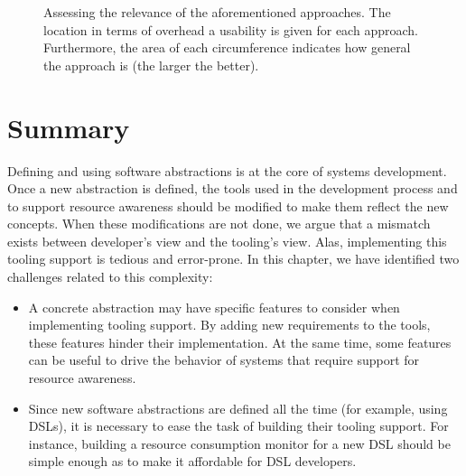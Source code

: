 \begin{figure}[!ht]
\caption{Assessing the relevance of the aforementioned approaches. The location in terms of overhead a usability is given for each approach. Furthermore, the area of each circumference indicates how general the approach is (the larger the better).} \label{fig:position-approaches-to-simplify}
\end{figure}

\section{Summary}


Defining and using software abstractions is at the core of systems development.
Once a new abstraction is defined, the tools used in the development process and to support resource awareness should be modified to make them reflect the new concepts.
When these modifications are not done, we argue that a mismatch exists between developer's view and the tooling's view.
Alas, implementing this tooling support is tedious and error-prone.
In this chapter, we have identified two challenges related to this complexity:

\begin{itemize}
\item A concrete abstraction may have specific features to consider when implementing tooling support.
By adding new requirements to the tools, these features hinder their implementation.
At the same time, some features can be useful to drive the behavior of systems that require support for resource awareness.

\item Since new software abstractions are defined all the time (for example, using DSLs), it is necessary to ease the task of building their tooling support.
For instance, building a resource consumption monitor for a new DSL should be simple enough as to make it affordable for DSL developers.
\end{itemize}   

